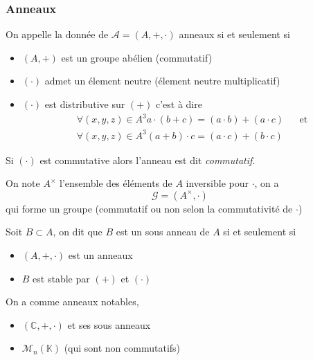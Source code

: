 \documentclass[11pt,colorlinks]{book}
\theoremstyle{mytheoremstyle}
\theoremstyle{mytheoremstyle}
\theoremstyle{mytheoremstyle}
\theoremstyle{mytheoremstyle}
\theoremstyle{mytheoremstyle}
\theoremstyle{mytheoremstyle}
\theoremstyle{mytheoremstyle}
\theoremstyle{mytheoremstyle}
\theoremstyle{myproblemstyle}
\def\mbb#1{\mathbb{#1}}
\def\bC{\mbb{C}}
\def\bK{\mbb{K}}
\begin{document}
\subsubsection{Anneaux}
\begin{definition}
  On appelle la donnée de $\mathcal A = (A,+,\cdot)$ anneaux si et seulement si 
  \begin{itemize}
    \item $(A,+)$ est un groupe abélien (commutatif)
    \item $(\cdot)$ admet un élement neutre (élement neutre multiplicatif)
    \item $(\cdot)$ est distributive sur $(+)$ c'est à dire
    \begin{align*}
      &\forall (x,y,z) \in A^3 a \cdot (b+c) = (a \cdot b) + (a \cdot c) && \text{et} \\ 
      &\forall (x,y,z) \in A^3 (a+b) \cdot c = (a \cdot c) + (b \cdot c)
    \end{align*}
  \end{itemize}
\end{definition}
\begin{rmq}
  Si $(\cdot)$ est commutative alors l'anneau est dit \textit{commutatif}.
\end{rmq}
\begin{definition}
  On note $A^{\times}$ l'ensemble des éléments de $A$ inversible pour $\cdot$, on a 
  \begin{equation*}
    \mathcal G = (A^{\times},\cdot)
  \end{equation*}
  qui forme un groupe (commutatif ou non selon la commutativité de $\cdot$)
\end{definition}
\begin{definition}
  Soit $B \subset A$, on dit que $B$ est un sous anneau de $A$ si et seulement si 
  \begin{itemize}
    \item $(A,+,\cdot)$ est un anneaux
    \item $B$ est stable par $(+)$ et $(\cdot)$
  \end{itemize}
\end{definition}
\begin{ex}
  On a comme anneaux notables,
  \begin{itemize}
    \item $(\bC,+,\cdot)$ et ses sous anneaux 
    \item $\mathcal{M}_{n}(\bK)$ (qui sont non commutatifs)
  \end{itemize}
\end{ex}
\end{document}
